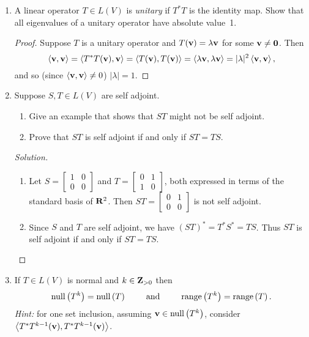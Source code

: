 \documentclass[11pt]{amsart}
\begin{document}
\begin{enumerate}[(1)]

\item A linear operator $T \in L(V)$ is \emph{unitary} if $T^* T$ is the identity map.
Show that all eigenvalues of a unitary operator have absolute value~1.

\begin{proof}
Suppose $T$ is a unitary operator and $T(\mathbf v) = \lambda \mathbf v$ for some $\mathbf v \ne \mathbf 0$. Then
\[
  \left< \mathbf v, \mathbf v \right>
  = \left< T^* T(\mathbf v), \mathbf v \right>
  = \left< T(\mathbf v), T(\mathbf v) \right>
  = \left< \lambda \mathbf v, \lambda \mathbf v \right>
  = |\lambda|^2 \left< \mathbf v, \mathbf v \right> ,
\]
and so (since $\left< \mathbf v, \mathbf v \right> \ne 0$) $|\lambda| = 1$.
\end{proof}

\item Suppose $S, T \in L(V)$ are self adjoint.
  \begin{enumerate}
  \item Give an example that shows that $ST$ might not be self adjoint.
  \item Prove that $ST$ is self adjoint if and only if $ST = TS$.
  \end{enumerate}

\begin{proof}[Solution]
\begin{enumerate}

\item Let $S = \begin{bmatrix} 1&0\\ 0&0 \end{bmatrix}$ and $T = \begin{bmatrix} 0&1\\ 1&0 \end{bmatrix}$, both expressed in terms of the standard basis of $\mathbf{R}^2$.
Then $ST = \begin{bmatrix} 0&1\\ 0&0 \end{bmatrix}$ is not self adjoint.

\item Since $S$ and $T$ are self adjoint, we have $(ST)^* = T^* S^* = TS$.
Thus $ST$ is self adjoint if and only if $ST = TS$. \qedhere

\end{enumerate}
\end{proof}

\item If $T \in L(V)$ is normal and $k \in \mathbf{Z}_{ >0 }$ then
\[
  \operatorname{null} \left( T^k \right) = \operatorname{null} \left( T \right)
  \qquad \text{ and } \qquad
  \operatorname{range} \left( T^k \right) = \operatorname{range} \left( T \right) .
\]
\emph{Hint:} for one set inclusion, assuming $\mathbf v \in \operatorname{null} \left( T^k \right)$, consider $\left<  T^* T^{ k-1 } (\mathbf v) ,  T^* T^{ k-1 } (\mathbf v)  \right>$.


\end{enumerate}
\end{document}
